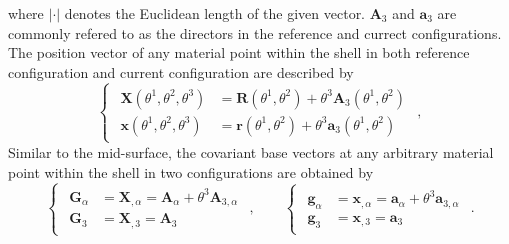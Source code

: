 where $\vert\cdot\vert$ denotes the Euclidean length of the given vector. $\mathbf{A}_3$ and $\mathbf{a}_3$ are commonly refered to as the directors in the reference and currect configurations. The position vector of any material point within the shell in both reference configuration and current configuration are described by
\begin{equation}
	\label{eq:position_vector}
	\begin{cases}
		\begin{aligned}
			\mathbf{X}(\theta^1, \theta^2, \theta^3) & = \mathbf{R}(\theta^1, \theta^2) + \theta^3\mathbf{A}_3(\theta^1,\theta^2) \\
			\mathbf{x}(\theta^1, \theta^2, \theta^3) & = \mathbf{r}(\theta^1, \theta^2) + \theta^3\mathbf{a}_3(\theta^1,\theta^2)
		\end{aligned}
	\end{cases},
\end{equation}
Similar to the mid-surface, the covariant base vectors at any arbitrary material point within the shell in two configurations are obtained by
\begin{equation}
	\label{eq:base_vector}
	\begin{cases}
		\begin{aligned}
			\mathbf{G}_\alpha & =\mathbf{X}_{,\alpha} = \mathbf{A}_\alpha+\theta^3\mathbf{A}_{3,\alpha} \\
			\mathbf{G}_3      & = \mathbf{X}_{,3} = \mathbf{A}_3
		\end{aligned}
	\end{cases},\qquad
	\begin{cases}
		\begin{aligned}
			\mathbf{g}_\alpha & =\mathbf{x}_{,\alpha} = \mathbf{a}_\alpha+\theta^3\mathbf{a}_{3,\alpha} \\
			\mathbf{g}_3      & = \mathbf{x}_{,3} = \mathbf{a}_3
		\end{aligned}
	\end{cases}.
\end{equation}


